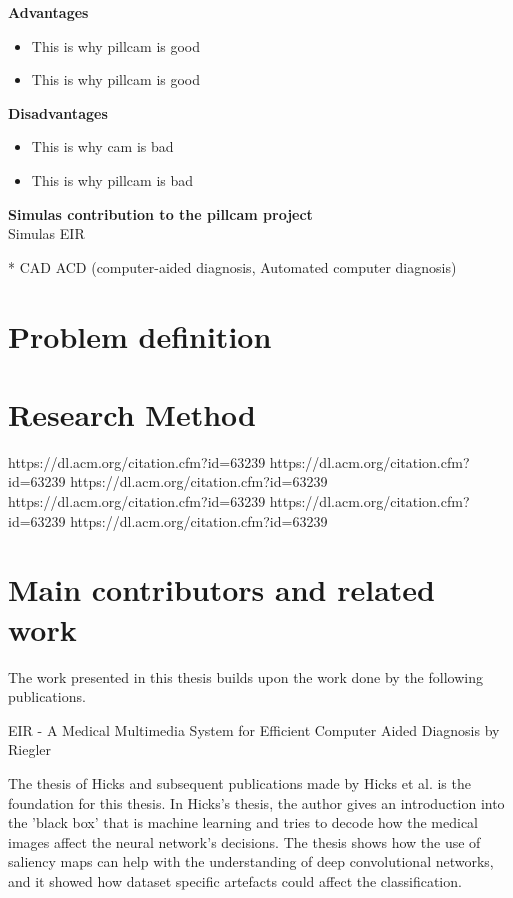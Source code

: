     \textbf{Advantages}
      \begin{itemize}
        \item This is why pillcam is good %
        \item This is why pillcam is good %
      \end{itemize}

    \vspace{5px}
    \textbf{Disadvantages}
      \begin{itemize}
        \item This is why cam is bad %
        \item This is why pillcam is bad %
      \end{itemize}
 
    
    
    \vspace{10px}

\textbf{Simulas contribution to the pillcam project}\\
    Simulas EIR
        

        
    * CAD ACD (computer-aided diagnosis, Automated computer diagnosis)

    \vspace{10px}
    
    
\section{Problem definition}
\section{Research Method}
https://dl.acm.org/citation.cfm?id=63239
https://dl.acm.org/citation.cfm?id=63239
https://dl.acm.org/citation.cfm?id=63239
https://dl.acm.org/citation.cfm?id=63239
https://dl.acm.org/citation.cfm?id=63239
https://dl.acm.org/citation.cfm?id=63239

\section{Main contributors and related work}
The work presented in this thesis builds upon the work done by the following publications.


EIR - A Medical Multimedia System for Efficient
Computer Aided Diagnosis by Riegler 

The thesis of Hicks and subsequent publications made by Hicks et al. is the foundation for this thesis. In Hicks's thesis, the author gives an introduction into the 'black box' that is machine learning and tries to decode how the medical images affect the neural network's decisions. 
The thesis shows how the use of saliency maps can help with the understanding of deep convolutional networks, and it showed how dataset specific artefacts could affect the classification.


